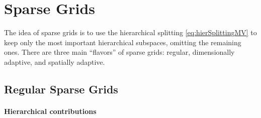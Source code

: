 \section{Sparse Grids}
\label{sec:23sparseGrids}


\noindent
The idea of sparse grids is to use the
hierarchical splitting \eqref{eq:hierSplittingMV}
to keep only the most important hierarchical subspaces,
omitting the remaining ones.
There are three main ``flavors'' of sparse grids:
regular, dimensionally adaptive, and spatially adaptive.



\subsection{Regular Sparse Grids}
\label{sec:231regularSG}

\paragraph{Hierarchical contributions}

